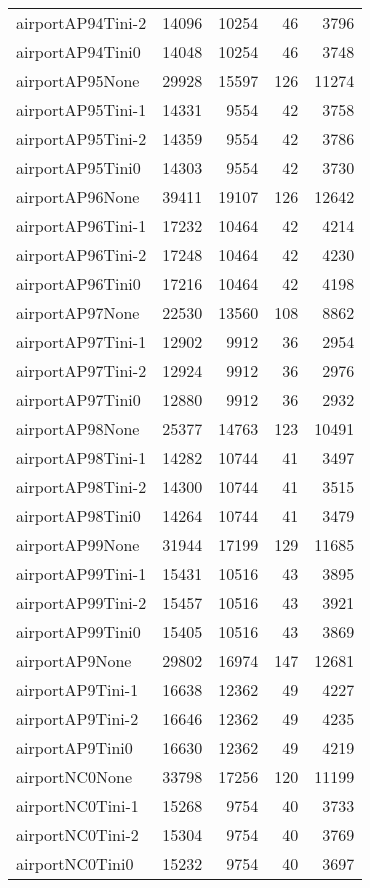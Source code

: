 \begin{longtable}{lrrrr}
airportAP94Tini-2 & 14096 & 10254 & 46 & 3796 \\
airportAP94Tini0 & 14048 & 10254 & 46 & 3748 \\
airportAP95None & 29928 & 15597 & 126 & 11274 \\
airportAP95Tini-1 & 14331 & 9554 & 42 & 3758 \\
airportAP95Tini-2 & 14359 & 9554 & 42 & 3786 \\
airportAP95Tini0 & 14303 & 9554 & 42 & 3730 \\
airportAP96None & 39411 & 19107 & 126 & 12642 \\
airportAP96Tini-1 & 17232 & 10464 & 42 & 4214 \\
airportAP96Tini-2 & 17248 & 10464 & 42 & 4230 \\
airportAP96Tini0 & 17216 & 10464 & 42 & 4198 \\
airportAP97None & 22530 & 13560 & 108 & 8862 \\
airportAP97Tini-1 & 12902 & 9912 & 36 & 2954 \\
airportAP97Tini-2 & 12924 & 9912 & 36 & 2976 \\
airportAP97Tini0 & 12880 & 9912 & 36 & 2932 \\
airportAP98None & 25377 & 14763 & 123 & 10491 \\
airportAP98Tini-1 & 14282 & 10744 & 41 & 3497 \\
airportAP98Tini-2 & 14300 & 10744 & 41 & 3515 \\
airportAP98Tini0 & 14264 & 10744 & 41 & 3479 \\
airportAP99None & 31944 & 17199 & 129 & 11685 \\
airportAP99Tini-1 & 15431 & 10516 & 43 & 3895 \\
airportAP99Tini-2 & 15457 & 10516 & 43 & 3921 \\
airportAP99Tini0 & 15405 & 10516 & 43 & 3869 \\
airportAP9None & 29802 & 16974 & 147 & 12681 \\
airportAP9Tini-1 & 16638 & 12362 & 49 & 4227 \\
airportAP9Tini-2 & 16646 & 12362 & 49 & 4235 \\
airportAP9Tini0 & 16630 & 12362 & 49 & 4219 \\
airportNC0None & 33798 & 17256 & 120 & 11199 \\
airportNC0Tini-1 & 15268 & 9754 & 40 & 3733 \\
airportNC0Tini-2 & 15304 & 9754 & 40 & 3769 \\
airportNC0Tini0 & 15232 & 9754 & 40 & 3697 \\

\end{longtable}
